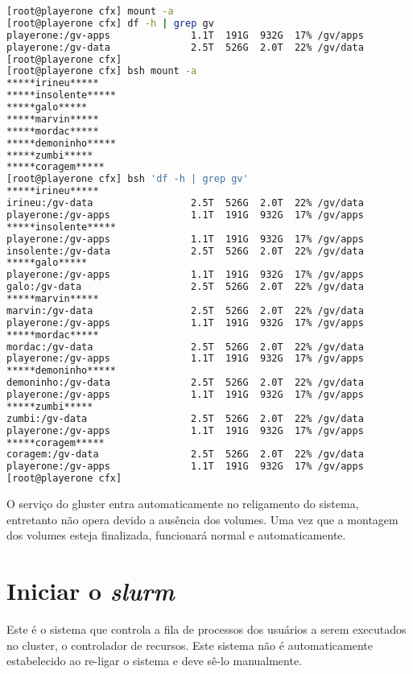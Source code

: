 \begin{lstlisting}[language=bash,basicstyle=\small]
[root@playerone cfx] mount -a  
[root@playerone cfx] df -h | grep gv
playerone:/gv-apps              1.1T  191G  932G  17% /gv/apps
playerone:/gv-data              2.5T  526G  2.0T  22% /gv/data
[root@playerone cfx] 
[root@playerone cfx] bsh mount -a
*****irineu*****
*****insolente*****
*****galo*****
*****marvin*****
*****mordac*****
*****demoninho*****
*****zumbi*****
*****coragem*****
[root@playerone cfx] bsh 'df -h | grep gv'
*****irineu*****
irineu:/gv-data                 2.5T  526G  2.0T  22% /gv/data
playerone:/gv-apps              1.1T  191G  932G  17% /gv/apps
*****insolente*****
playerone:/gv-apps              1.1T  191G  932G  17% /gv/apps
insolente:/gv-data              2.5T  526G  2.0T  22% /gv/data
*****galo*****
playerone:/gv-apps              1.1T  191G  932G  17% /gv/apps
galo:/gv-data                   2.5T  526G  2.0T  22% /gv/data
*****marvin*****
marvin:/gv-data                 2.5T  526G  2.0T  22% /gv/data
playerone:/gv-apps              1.1T  191G  932G  17% /gv/apps
*****mordac*****
mordac:/gv-data                 2.5T  526G  2.0T  22% /gv/data
playerone:/gv-apps              1.1T  191G  932G  17% /gv/apps
*****demoninho*****
demoninho:/gv-data              2.5T  526G  2.0T  22% /gv/data
playerone:/gv-apps              1.1T  191G  932G  17% /gv/apps
*****zumbi*****
zumbi:/gv-data                  2.5T  526G  2.0T  22% /gv/data
playerone:/gv-apps              1.1T  191G  932G  17% /gv/apps
*****coragem*****
coragem:/gv-data                2.5T  526G  2.0T  22% /gv/data
playerone:/gv-apps              1.1T  191G  932G  17% /gv/apps
[root@playerone cfx]
\end{lstlisting}


O serviço do gluster entra automaticamente no religamento do sistema, entretanto não opera devido a ausência dos volumes. Uma vez que a montagem dos volumes esteja finalizada, funcionará normal e automaticamente. 

\section{Iniciar o \textit{slurm}}
Este é o sistema que controla a fila de processos dos usuários a serem executados no cluster, o controlador de
recursos. Este sistema não é automaticamente estabelecido ao re-ligar o sistema e deve sê-lo manualmente.

